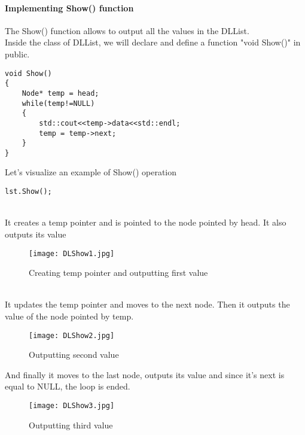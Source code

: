 \documentclass[11pt,fleqn]{book} %
\begin{document}
\paragraph{Implementing Show() function}
The Show()  function allows to output all the values in the DLList. \\
Inside the class of DLList, we will declare and define a function "void Show()" in public.
\begin{lstlisting}
void Show()
{
	Node* temp = head;
	while(temp!=NULL)
	{
		std::cout<<temp->data<<std::endl;
		temp = temp->next;
	}
}
\end{lstlisting}
\newpage
Let's visualize an example of Show() operation
\begin{example}
	\begin{lstlisting}
lst.Show();
	\end{lstlisting}~\\
It creates a temp pointer and is pointed to the node pointed by head. It also outputs its value
\begin{figure}[H]
	\centering
	\texttt{[image: DLShow1.jpg]}
	\caption{Creating temp pointer and outputting first value}
\end{figure} ~\\
It updates the temp pointer and moves to the next node. Then it outputs the value of the node pointed by temp.
\begin{figure}[H]
	\centering
	\texttt{[image: DLShow2.jpg]}
	\caption{Outputting second value}
\end{figure}
\newpage
And finally it moves to the last node, outputs its value and since it's next is equal to NULL, the loop is ended.
\begin{figure}[H]
	\centering
	\texttt{[image: DLShow3.jpg]}
	\caption{Outputting third value}
\end{figure} ~\\
\end{example}
\newpage
\end{document}
